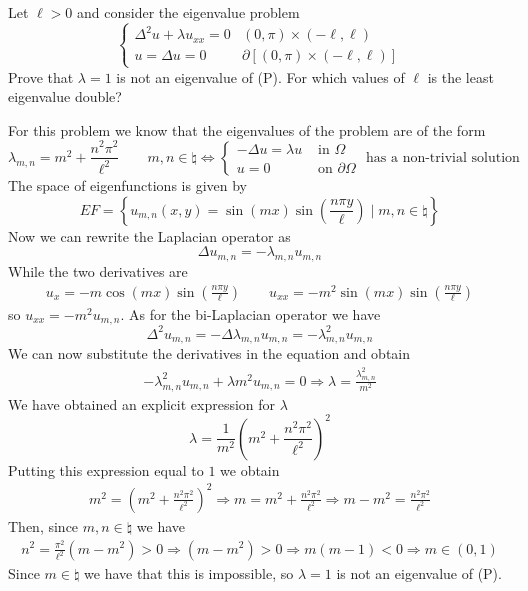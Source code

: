 \newpage
\begin{exercise}
    Let \(\ell > 0\) and consider the eigenvalue problem
    \[
        \begin{cases}
            \Delta^2 u + \lambda u_{xx} = 0 & (0, \pi) \times (-\ell, \ell) \\
            u =  \Delta u = 0 & \partial\left[(0, \pi) \times (-\ell, \ell)\right]
        \end{cases}
        \tag*{(P)}
    \]
    Prove that \(\lambda = 1\) is not an eigenvalue of (P). For which values of \(\ell\) is the least eigenvalue double?
\end{exercise}

For this problem we know that the eigenvalues of the problem are of the form
\[
    \lambda_{m,n} = m^2 +  \frac{n^2 \pi^2}{\ell^2} \qquad m, n \in \natural \iff \begin{cases}
        -\Delta u = \lambda u & \text{ in } \Omega \\
        u = 0 & \text{ on } \partial\Omega
    \end{cases} \text{ has a non-trivial solution}
\]
The space of eigenfunctions is given by
\[
    EF = \left\{ u_{m,n}(x, y) = \sin(mx) \sin\left(\frac{n \pi y}{\ell}\right) \mid m, n \in \natural \right\}
\]
Now we can rewrite the Laplacian operator as
\[
    \Delta u_{m,n} = - \lambda_{m,n} u_{m,n} 
\]
While the two derivatives are
\[
    \begin{split}
        u_x = -m \cos(mx) \sin\left(\frac{n \pi y}{\ell}\right) \qquad u_{xx} = -m^2 \sin(mx) \sin\left(\frac{n \pi y}{\ell}\right) 
    \end{split}
\]
so \(u_{xx} = -m^2 u_{m,n}\). As for the bi-Laplacian operator we have
\[
    \Delta^2 u_{m,n} = - \Delta \lambda_{m,n} u_{m,n} = - \lambda_{m,n}^2 u_{m,n}
\]
We can now substitute the derivatives in the equation and obtain
\[
    \begin{split}
        - \lambda_{m,n}^2 u_{m,n} + \lambda m^2 u_{m,n} = 0 \Rightarrow \lambda = \frac{\lambda_{m,n}^2}{m^2}
    \end{split}
\]
We have obtained an explicit expression for \(\lambda\)
\[
    \lambda = \frac{1}{m^2} \left(m^2 + \frac{n^2 \pi^2}{\ell^2}\right)^2
\] 
Putting this expression equal to \(1\) we obtain
\[
    \begin{split}
        m^2 = \left(m^2 + \frac{n^2 \pi^2}{\ell^2}\right)^2 \Rightarrow  m = m^2 + \frac{n^2 \pi^2}{\ell^2} \Rightarrow m - m^2 = \frac{n^2 \pi^2}{\ell^2}
    \end{split}
\]
Then, since \(m, n \in \natural\) we have
\[
    \begin{split}
        n^2 = \frac{\pi^2}{\ell^2} \left(m - m^2\right) > 0 \Rightarrow (m - m^2) > 0 \Rightarrow m(m - 1) < 0 \Rightarrow m \in (0,1)
    \end{split}
\]
Since \(m \in \natural\) we have that this is impossible, so \(\lambda = 1\) is not an eigenvalue of (P).

